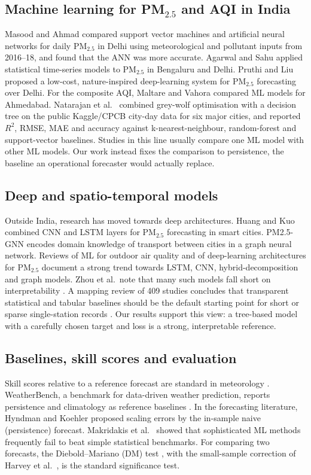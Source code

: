 \documentclass[conference]{IEEEtran}
\begin{document}
\subsection{Machine learning for PM$_{2.5}$ and AQI in India}
Masood and Ahmad \cite{masood2020} compared support vector machines and artificial
neural networks for daily PM$_{2.5}$ in Delhi using meteorological and pollutant
inputs from 2016--18, and found that the ANN was more accurate. Agarwal and Sahu
\cite{agarwal2023} applied statistical time-series models to PM$_{2.5}$ in
Bengaluru and Delhi. Pruthi and Liu \cite{pruthi2022} proposed a low-cost,
nature-inspired deep-learning system for PM$_{2.5}$ forecasting over Delhi. For the
composite AQI, Maltare and Vahora \cite{maltare2023} compared ML models for
Ahmedabad. Natarajan et al.\ \cite{natarajan2024} combined grey-wolf optimisation with a
decision tree on the public Kaggle/CPCB city-day data for six major cities, and reported
$R^2$, RMSE, MAE and accuracy against k-nearest-neighbour, random-forest and
support-vector baselines. Studies in this line usually compare one ML model with other ML
models. Our work instead fixes the comparison to persistence, the baseline an operational
forecaster would actually replace.

\subsection{Deep and spatio-temporal models}
Outside India, research has moved towards deep architectures. Huang and Kuo
\cite{huang2018} combined CNN and LSTM layers for PM$_{2.5}$ forecasting in smart
cities. PM2.5-GNN \cite{wang2020gnn} encodes domain knowledge of transport between
cities in a graph neural network. Reviews of ML for outdoor air quality
\cite{rybarczyk2018,bai2018} and of deep-learning architectures for PM$_{2.5}$
\cite{zhou2024} document a strong trend towards LSTM, CNN, hybrid-decomposition and
graph models. Zhou et al.\ note that many such models fall short on interpretability
\cite{zhou2024}. A mapping review of 409 studies concludes that transparent
statistical and tabular baselines should be the default starting point for short or sparse
single-station records \cite{chianese2026}. Our results support this view: a
tree-based model with a carefully chosen target and loss is a strong, interpretable
reference.

\subsection{Baselines, skill scores and evaluation}
Skill scores relative to a reference forecast are standard in meteorology
\cite{murphy1988}. WeatherBench, a benchmark for data-driven weather prediction, reports
persistence and climatology as reference baselines \cite{rasp2020}. In the forecasting
literature, Hyndman and Koehler \cite{hyndman2006} proposed scaling errors by the
in-sample naive (persistence) forecast. Makridakis et al.\ \cite{makridakis2018} showed that
sophisticated ML methods frequently fail to beat simple statistical benchmarks. For
comparing two forecasts, the Diebold--Mariano (DM) test \cite{diebold1995}, with the
small-sample correction of Harvey et al.\ \cite{harvey1997}, is the standard
significance test.
\end{document}
